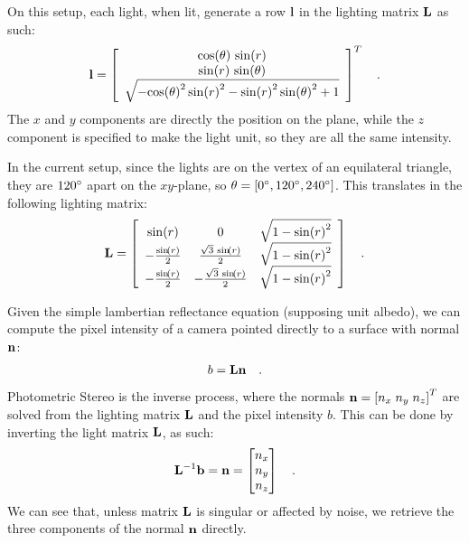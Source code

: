\documentclass{report}
\begin{document}
On this setup, each light, when lit, generate a row $\mathbf{l}$ in the lighting matrix $\mathbf{L}$ as such:
\begin{equation}
\B{l} =
\left[\begin{array}{c} \cos\!\left(\theta\right)\, \sin\!\left(r\right) \\ \sin\!\left(r\right)\, \sin\!\left(\theta\right) \\ \sqrt{ - {\cos\!\left(\theta\right)}^2\, {\sin\!\left(r\right)}^2 - {\sin\!\left(r\right)}^2\, {\sin\!\left(\theta\right)}^2 + 1} \end{array}\right]^T
\quad .
\end{equation}
The $x$ and $y$ components are directly the position on the plane, while the $z$ component is specified to make the light unit, so they are all the same intensity.

In the current setup, since the lights are on the vertex of an equilateral triangle, they are $120\degree$ apart on the $xy$-plane, so $\theta = \left[ 0\degree, 120\degree, 240\degree \right]$. This translates in the following lighting matrix:
\begin{equation}
\B{L} =
\left[\begin{array}{ccc} \sin\!\left(r\right) & 0 & \sqrt{1 - {\sin\!\left(r\right)}^2}\\ -\frac{\sin\!\left(r\right)}{2} & \frac{\sqrt{3}\, \sin\!\left(r\right)}{2} & \sqrt{1 - {\sin\!\left(r\right)}^2}\\ -\frac{\sin\!\left(r\right)}{2} & -\frac{\sqrt{3}\, \sin\!\left(r\right)}{2} & \sqrt{1 - {\sin\!\left(r\right)}^2} \end{array}\right]
\quad .
\end{equation}

Given the simple lambertian reflectance equation (supposing unit albedo), we can compute the pixel intensity of a camera pointed directly to a surface with normal $\mathbf{n}$:
\begin{equation}
b = \mathbf{L}\mathbf{n}
\quad.
\end{equation}
Photometric Stereo is the inverse process, where the normals $\mathbf{n} = \left[ n_x \; n_y \; n_z\right]^T$ are solved from the lighting matrix $\mathbf{L}$ and the pixel intensity $b$. This can be done by inverting the light matrix $\mathbf{L}$, as such:
\begin{equation}
\mathbf{L}^{-1}\mathbf{b} = \mathbf{n} = 
\begin{bmatrix}
n_x \\
n_y \\
n_z 
\end{bmatrix}
\quad.
\end{equation}
We can see that, unless matrix $\mathbf{L}$ is singular or affected by noise, we retrieve the three components of the normal $\mathbf{n}$ directly.
\end{document}

